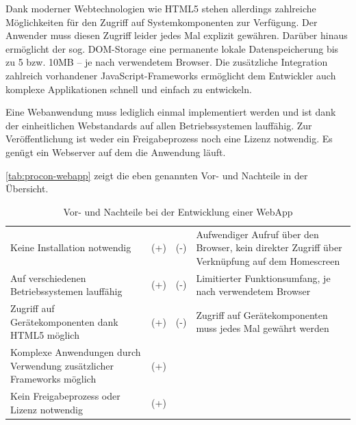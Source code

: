 Dank moderner Webtechnologien wie HTML5 stehen allerdings zahlreiche Möglichkeiten für den Zugriff auf Systemkomponenten zur Verfügung. Der Anwender muss diesen Zugriff leider jedes Mal explizit gewähren. Darüber hinaus ermöglicht der sog. DOM-Storage eine permanente lokale Datenspeicherung bis zu 5 bzw. 10MB – je nach verwendetem Browser. Die zusätzliche Integration zahlreich vorhandener JavaScript-Frameworks ermöglicht dem Entwickler auch komplexe Applikationen schnell und einfach zu entwickeln.

Eine Webanwendung muss lediglich einmal implementiert werden und ist dank der einheitlichen Webstandards auf allen Betriebssystemen lauffähig. Zur Veröffentlichung ist weder ein Freigabeprozess noch eine Lizenz notwendig. Es genügt ein Webserver auf dem die Anwendung läuft.

\vref*{tab:procon-webapp} zeigt die eben genannten Vor- und Nachteile in der Übersicht.

\begin{table}[H]
  \begin{center}\small\renewcommand{\arraystretch}{1.4}\sffamily %
    \begin{tabulary}{\textwidth}{>{\raggedleft}m{61mm} *{2}{>{\ttfamily}m{5mm}} m{61mm}}
    	&	\\ \hline
    
    Keine Installation notwendig & (+) &
    (-) & Aufwendiger Aufruf über den Browser, kein direkter Zugriff über Verknüpfung auf dem Homescreen\\
    
    Auf verschiedenen Betriebssystemen lauffähig & (+) & (-) & Limitierter Funktionsumfang, je nach verwendetem Browser\\
    
    Zugriff auf Gerätekomponenten dank HTML5 möglich & (+) & (-) & Zugriff auf Gerätekomponenten muss jedes Mal gewährt werden\\
    
    Komplexe Anwendungen durch Verwendung zusätzlicher Frameworks möglich & (+) & &\\
    
    Kein Freigabeprozess oder Lizenz notwendig & (+) & &

    \end{tabulary}        
    
    \caption{Vor- und Nachteile bei der Entwicklung einer WebApp}
    \label{tab:procon-webapp}
  \end{center}
\end{table}


